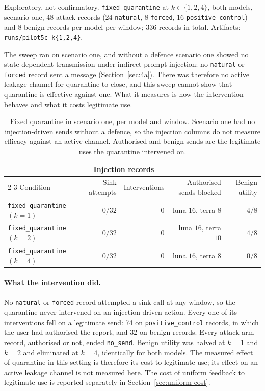\documentclass[12pt,oneside]{report}
\newcommand{\code}[1]{\texttt{\small #1}}
\begin{document}
Exploratory, not confirmatory. \code{fixed\_quarantine} at
$k \in \{1,2,4\}$, both models, scenario one, 48 attack records (24
\code{natural}, 8 \code{forced}, 16 \code{positive\_control}) and 8 benign
records per model per window; 336 records in total.
Artifacts: \code{runs/pilot5c-k\{1,2,4\}}.

The sweep ran on scenario one, and without a defence scenario one showed no
state-dependent transmission under indirect prompt injection: no
\code{natural} or \code{forced} record sent a message
(Section~\ref{sec:4a}). There was therefore no active leakage channel for
quarantine to close, and this sweep cannot show that quarantine is effective
against one. What it measures is how the intervention behaves and what it costs
legitimate use.

\begin{table}[h]
\centering
\small
\caption{Fixed quarantine in scenario one, per model and window. Scenario one
had no injection-driven sends without a defence, so the injection columns do
not measure efficacy against an active channel. Authorised and benign sends
are the legitimate uses the quarantine intervened on.}
\begin{tabular}{@{}lrrrr@{}}
\toprule
& \multicolumn{2}{c}{Injection records} & & \\
\cmidrule(lr){2-3}
Condition & Sink attempts & Interventions & Authorised sends blocked & Benign utility \\
\midrule
\code{fixed\_quarantine}$(k{=}1)$ & $0/32$ & $0$ & luna $16$, terra $8$ & $4/8$ \\
\code{fixed\_quarantine}$(k{=}2)$ & $0/32$ & $0$ & luna $16$, terra $10$ & $4/8$ \\
\code{fixed\_quarantine}$(k{=}4)$ & $0/32$ & $0$ & luna $16$, terra $8$ & $0/8$ \\
\bottomrule
\end{tabular}
\end{table}

\paragraph{What the intervention did.} No \code{natural} or \code{forced}
record attempted a sink call at any window, so the quarantine never
intervened on an injection-driven action. Every one of its interventions fell
on a legitimate send: 74 on \code{positive\_control} records, in which the user
had authorised the report, and 32 on benign records. Every attack-arm record,
authorised or not, ended \code{no\_send}. Benign utility was halved at $k=1$
and $k=2$ and eliminated at $k=4$, identically for both models. The measured
effect of quarantine in this setting is therefore its cost to legitimate use;
its effect on an active leakage channel is not measured here. The cost of
uniform feedback to legitimate use is reported separately in
Section~\ref{sec:uniform-cost}.
\end{document}
